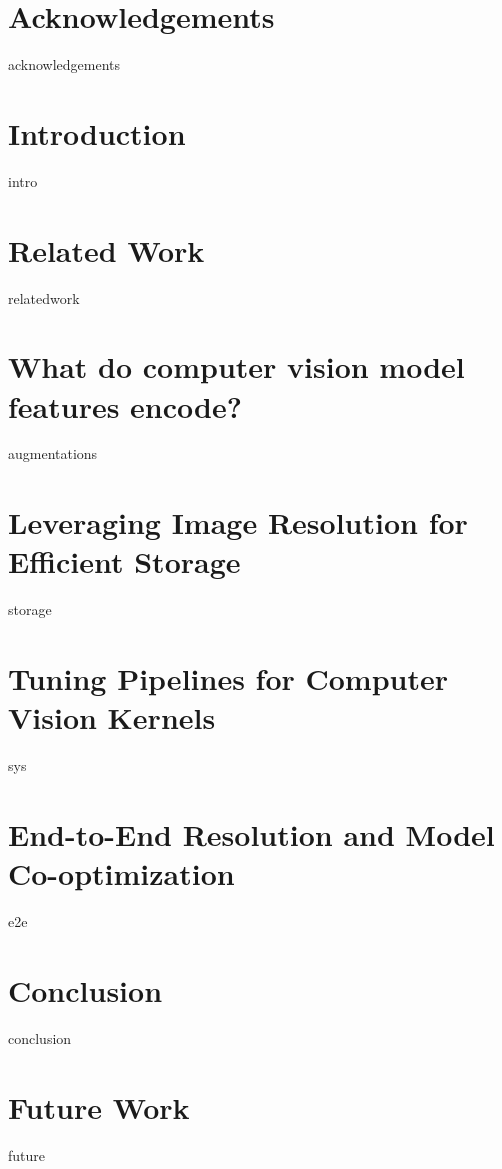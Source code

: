 \documentclass[ twoside,openright,titlepage,numbers=noenddot,headinclude,
                footinclude=true,cleardoublepage=empty,abstractoff,%
                BCOR=5mm,paper=letter,fontsize=11pt,letterpaper,%
                american,%
                ]{scrreprt}
\begin{document}

\cleardoublepage
{}
\chapter*{Acknowledgements}
{acknowledgements}

\chapter{Introduction}
{intro}
\chapter{Related Work}
{relatedwork}
\chapter{What do computer vision model features encode?}
\label{ch:augmentations}
{augmentations}

\chapter{Leveraging Image Resolution for Efficient Storage}
\label{ch:storage}
{storage}

\chapter{Tuning Pipelines for Computer Vision Kernels}
\label{ch:sys}
{sys}

\chapter{End-to-End Resolution and Model Co-optimization}
\label{ch:e2e}
{e2e}

\chapter{Conclusion}
{conclusion}

\chapter{Future Work}
{future}

\cleardoublepage
\end{document}
